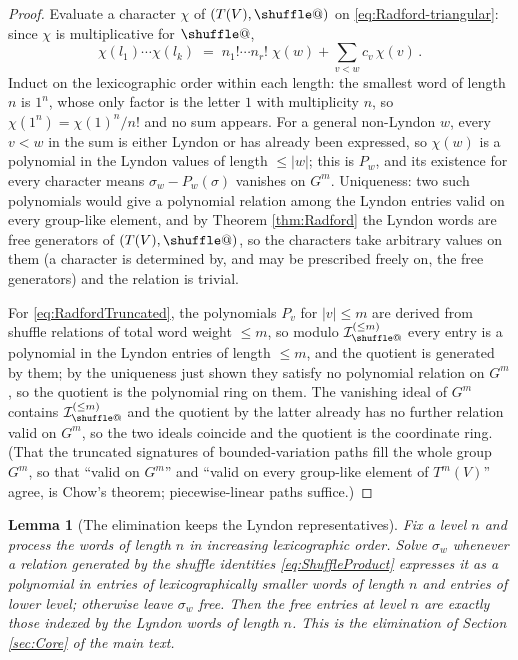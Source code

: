 \documentclass[11pt,english]{article}
\makeatletter
\providecommand*{\shuffle}{\mathbin{\mathpalette\shuffle@{}}}
\newcommand*{\shuffle@}[2]{%
  \sbox0{$#1\vcenter{}$}%
  \kern .15\ht0
  \rlap{\vrule height .25\ht0 depth 0pt width 2.5\ht0}%
  \raise.1\ht0\hbox to 2.5\ht0{%
    \vrule height 1.75\ht0 depth -.1\ht0 width .17\ht0
    \hfill
    \vrule height 1.75\ht0 depth -.1\ht0 width .17\ht0
    \hfill
    \vrule height 1.75\ht0 depth -.1\ht0 width .17\ht0}%
  \kern .15\ht0
}
\newtheorem{lemma}[theorem]{Lemma}
\theoremstyle{definition}
\theoremstyle{remark}
\makeatother
\begin{document}
\begin{proof}
Evaluate a character $\chi$ of $(T(V),\shuffle)$ on
\eqref{eq:Radford-triangular}: since $\chi$ is multiplicative for
$\shuffle$,
\[
\chi(l_{1})\cdots\chi(l_{k})\;=\;n_{1}!\cdots n_{r}!\;\chi(w)+\sum_{v<w}c_{v}\,\chi(v)\,.
\]
Induct on the lexicographic order within each length: the smallest
word of length $n$ is $1^{n}$, whose only factor is the letter $1$
with multiplicity $n$, so $\chi(1^{n})=\chi(1)^{n}/n!$ and no sum
appears. For a general non-Lyndon $w$, every $v<w$ in the sum is
either Lyndon or has already been expressed, so $\chi(w)$ is a
polynomial in the Lyndon values of length $\leq|w|$; this is $P_{w}$,
and its existence for every character means $\sigma_{w}-P_{w}(\sigma)$
vanishes on $G^{m}$. Uniqueness: two such polynomials would give a
polynomial relation among the Lyndon entries valid on every group-like
element, and by Theorem \ref{thm:Radford} the Lyndon words are free
generators of $(T(V),\shuffle)$, so the characters take arbitrary
values on them (a character is determined by, and may be prescribed
freely on, the free generators) and the relation is trivial.

For \eqref{eq:RadfordTruncated}, the polynomials $P_{v}$ for $|v|\leq m$
are derived from shuffle relations of total word weight $\leq m$, so modulo
$\mathcal{I}_{\shuffle}^{(\leq m)}$ every entry is a polynomial in the
Lyndon entries of length $\leq m$, and the quotient is generated by
them; by the uniqueness just shown they satisfy no polynomial relation
on $G^{m}$, so the quotient is the polynomial ring on them. The
vanishing ideal of $G^{m}$ contains $\mathcal{I}_{\shuffle}^{(\leq m)}$
and the quotient by the latter already has no further relation valid on
$G^{m}$, so the two ideals coincide and the quotient is the coordinate
ring. (That the truncated signatures of bounded-variation paths fill
the whole group $G^{m}$, so that ``valid on $G^{m}$'' and ``valid on
every group-like element of $T^{m}(V)$'' agree, is Chow's theorem;
piecewise-linear paths suffice.)
\end{proof}

\begin{lemma}[The elimination keeps the Lyndon representatives]
\label{lem:elimination}
Fix a level $n$ and process the words of length $n$ in increasing
lexicographic order. Solve $\sigma_{w}$ whenever a relation generated by
the shuffle identities \eqref{eq:ShuffleProduct} expresses it as a
polynomial in entries of lexicographically smaller words of length $n$
and entries of lower level; otherwise leave $\sigma_{w}$ free. Then the
free entries at level $n$ are exactly those indexed by the Lyndon words
of length $n$. This is the elimination of Section \ref{sec:Core} of the main text.
\end{lemma}
\end{document}
